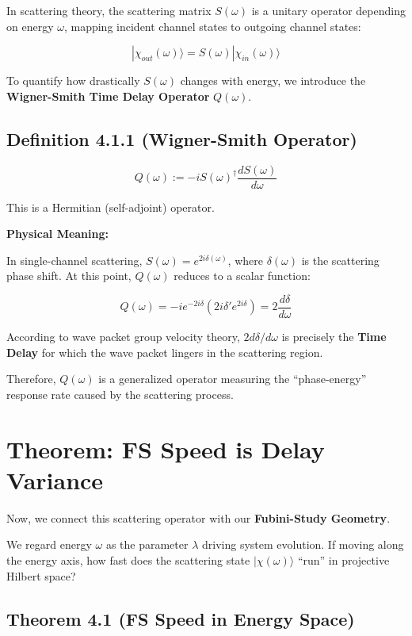 \documentclass[11pt,a4paper,twoside]{book}
\begin{document}
In scattering theory, the scattering matrix $S(\omega)$ is a unitary operator depending on energy $\omega$, mapping incident channel states to outgoing channel states:

$$|\chi_{out}(\omega)\rangle = S(\omega) |\chi_{in}(\omega)\rangle$$

To quantify how drastically $S(\omega)$ changes with energy, we introduce the \textbf{Wigner-Smith Time Delay Operator} $Q(\omega)$.

\subsection{Definition 4.1.1 (Wigner-Smith Operator)}

$$Q(\omega) := -i S(\omega)^{\dagger} \frac{d S(\omega)}{d\omega}$$

This is a Hermitian (self-adjoint) operator.

\textbf{Physical Meaning:}

In single-channel scattering, $S(\omega) = e^{2i\delta(\omega)}$, where $\delta(\omega)$ is the scattering phase shift. At this point, $Q(\omega)$ reduces to a scalar function:

$$Q(\omega) = -i e^{-2i\delta} (2i \delta' e^{2i\delta}) = 2 \frac{d\delta}{d\omega}$$

According to wave packet group velocity theory, $2d\delta/d\omega$ is precisely the \textbf{Time Delay} for which the wave packet lingers in the scattering region.

Therefore, $Q(\omega)$ is a generalized operator measuring the ``phase-energy'' response rate caused by the scattering process.

\section{Theorem: FS Speed is Delay Variance}

Now, we connect this scattering operator with our \textbf{Fubini-Study Geometry}.

We regard energy $\omega$ as the parameter $\lambda$ driving system evolution. If moving along the energy axis, how fast does the scattering state $|\chi(\omega)\rangle$ ``run'' in projective Hilbert space?

\subsection{Theorem 4.1 (FS Speed in Energy Space)}
\end{document}
